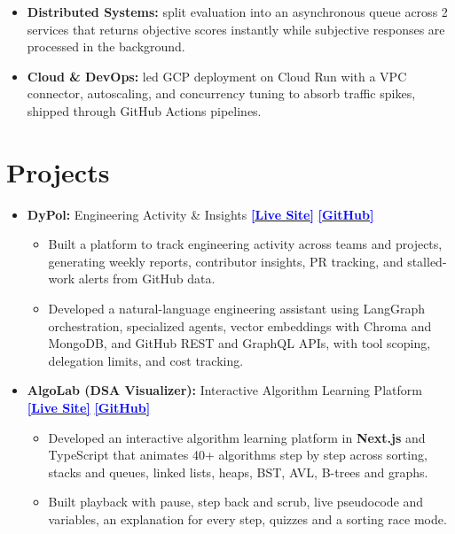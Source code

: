 \documentclass[a4paper,10pt]{article}
\begin{document}
\begin{itemize}
\begin{itemize}
    \item \textbf{Distributed Systems:} split evaluation into an asynchronous queue across 2 services that returns objective scores instantly while subjective responses are processed in the background.
    \item \textbf{Cloud \& DevOps:} led GCP deployment on Cloud Run with a VPC connector, autoscaling, and concurrency tuning to absorb traffic spikes, shipped through GitHub Actions pipelines.
\end{itemize}
\end{itemize}
\vspace{-1mm}
\section{Projects}
\begin{itemize}
\item \textbf{DyPol:} Engineering Activity \& Insights \hfill \href{https://www.dypol.dev/}{\textcolor{blue}{\textbf{[Live Site]}}} \textbar{} \href{https://github.com/RamcharanRajpurohit/DyPol}{\textcolor{blue}{\textbf{[GitHub]}}}
\begin{itemize}
\item Built a platform to track engineering activity across teams and projects, generating weekly reports, contributor insights, PR tracking, and stalled-work alerts from GitHub data.
\item Developed a natural-language engineering assistant using LangGraph orchestration, specialized agents, vector embeddings with Chroma and MongoDB, and GitHub REST and GraphQL APIs, with tool scoping, delegation limits, and cost tracking.
\end{itemize}
\item \textbf{AlgoLab (DSA Visualizer):} Interactive Algorithm Learning Platform \hfill \href{https://algolab.rajpurohit.me/}{\textcolor{blue}{\textbf{[Live Site]}}} \textbar{} \href{https://github.com/RamcharanRajpurohit/DSAVisualizer}{\textcolor{blue}{\textbf{[GitHub]}}}
\begin{itemize}
\item Developed an interactive algorithm learning platform in \textbf{Next.js} and TypeScript that animates 40+ algorithms step by step across sorting, stacks and queues, linked lists, heaps, BST, AVL, B-trees and graphs.
\item Built playback with pause, step back and scrub, live pseudocode and variables, an explanation for every step, quizzes and a sorting race mode.
\end{itemize}





\end{itemize}
\vspace{-1mm}
\end{document}
